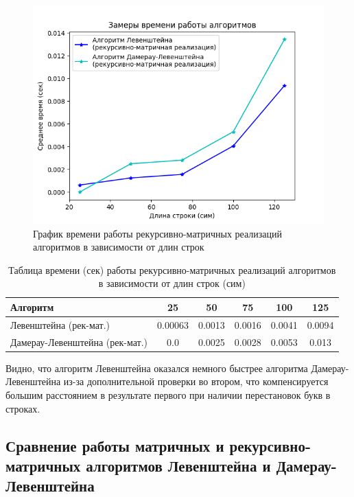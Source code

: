 \begin{figure}[H]
    \centering
    \includegraphics[width=1\textwidth]{img/graph_rec-mat.png}
    \caption{График времени работы рекурсивно-матричных реализаций алгоритмов в зависимости от длин строк}
    \label{fig:graph_rec-mat}
\end{figure}

\begin{table}[H]
    \centering
    \begin{tabular}{|l|c|c|c|c|c|}
        \hline
        \textbf{Алгоритм} & \textbf{25} & \textbf{50} & \textbf{75} & \textbf{100} & \textbf{125}\\
        \hline
        Левенштейна (рек-мат.) & 0.00063 & 0.0013 & 0.0016 & 0.0041 & 0.0094 \\
        Дамерау-Левенштейна (рек-мат.) & 0.0 & 0.0025 & 0.0028 & 0.0053 & 0.013  \\
        \hline
    \end{tabular}
    \caption{Таблица времени (сек) работы рекурсивно-матричных реализаций алгоритмов в зависимости от длин строк (сим)}
    \label{table:table_rec-mat}
\end{table}

Видно, что алгоритм Левенштейна оказался немного быстрее алгоритма Дамерау-Левенштейна из-за дополнительной проверки во втором, что компенсируется большим расстоянием в результате первого при наличии перестановок букв в строках.

\subsection{Сравнение работы матричных и рекурсивно-матричных алгоритмов Левенштейна и Дамерау-Левенштейна}

